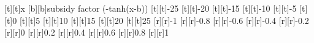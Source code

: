 %
%
\begin{psfrags}%
\psfragscanon%
%
[t][t]{x}%
[b][b]{subsidy factor (-tanh(x-b))}%
%
[t][t]{-25}%
[t][t]{-20}%
[t][t]{-15}%
[t][t]{-10}%
[t][t]{-5}%
[t][t]{0}%
[t][t]{5}%
[t][t]{10}%
[t][t]{15}%
[t][t]{20}%
[t][t]{25}%
%
[r][r]{-1}%
[r][r]{-0.8}%
[r][r]{-0.6}%
[r][r]{-0.4}%
[r][r]{-0.2}%
[r][r]{0}%
[r][r]{0.2}%
[r][r]{0.4}%
[r][r]{0.6}%
[r][r]{0.8}%
[r][r]{1}%
%
%
\end{psfrags}%
%
